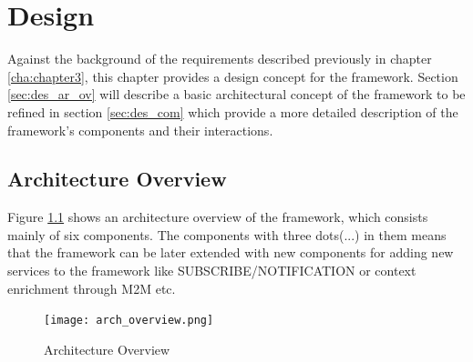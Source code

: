 \chapter{Design\label{cha:chapter4}}
Against the background of the requirements described previously in chapter \ref{cha:chapter3}, this chapter provides a design concept for the framework. Section \ref{sec:des_ar_ov} will describe a basic architectural concept of the framework to be refined in section \ref{sec:des_com} which provide a more detailed description of the framework's components and their interactions. 
        


\section{Architecture Overview\label{sec:des_ar_ov}}
Figure \ref{fig:arch_overview} shows an architecture overview of the framework, which consists mainly of six components. The components with three dots(...) in them means that the framework can be later extended with new components for adding new services to the framework like SUBSCRIBE/NOTIFICATION or context enrichment through \ac{M2M} etc.

\begin{figure}[htb]
  \centering
  \texttt{[image: arch\_overview.png]}\\
  \caption{Architecture Overview}
  \label{fig:arch_overview}
\end{figure}

%
%


